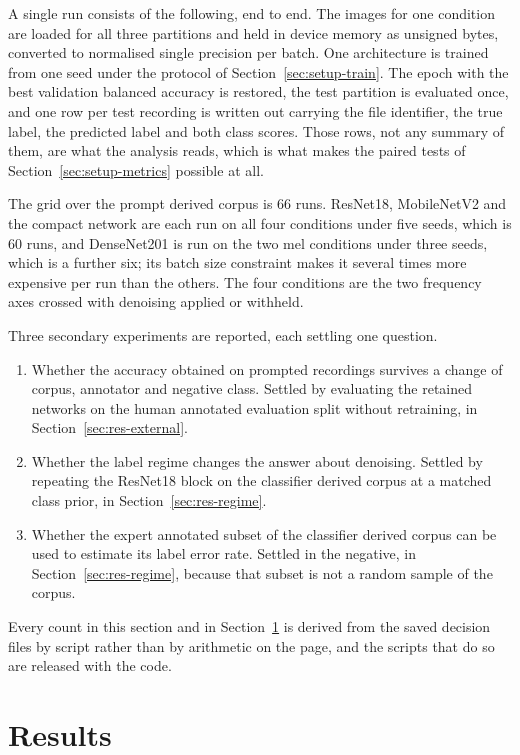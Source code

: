 \documentclass{ieeeaccess}
\begin{document}
A single run consists of the following, end to end. The images for one condition are
loaded for all three partitions and held in device memory as unsigned bytes, converted to
normalised single precision per batch. One architecture is trained from one seed under
the protocol of Section~\ref{sec:setup-train}. The epoch with the best validation
balanced accuracy is restored, the test partition is evaluated once, and one row per test
recording is written out carrying the file identifier, the true label, the predicted
label and both class scores. Those rows, not any summary of them, are what the analysis
reads, which is what makes the paired tests of Section~\ref{sec:setup-metrics} possible
at all.

The grid over the prompt derived corpus is $66$ runs. ResNet18, MobileNetV2 and the
compact network are each run on all four conditions under five seeds, which is $60$ runs,
and DenseNet201 is run on the two mel conditions under three seeds, which is a further
six; its batch size constraint makes it several times more expensive per run than the
others. The four conditions are the two frequency axes crossed with denoising applied or
withheld.

Three secondary experiments are reported, each settling one question.
\begin{enumerate}
\item Whether the accuracy obtained on prompted recordings survives a change of corpus,
      annotator and negative class. Settled by evaluating the retained networks on the
      human annotated evaluation split without retraining, in
      Section~\ref{sec:res-external}.
\item Whether the label regime changes the answer about denoising. Settled by repeating
      the ResNet18 block on the classifier derived corpus at a matched class prior, in
      Section~\ref{sec:res-regime}.
\item Whether the expert annotated subset of the classifier derived corpus can be used to
      estimate its label error rate. Settled in the negative, in
      Section~\ref{sec:res-regime}, because that subset is not a random sample of the
      corpus.
\end{enumerate}

Every count in this section and in Section~\ref{sec:results} is derived from the saved
decision files by script rather than by arithmetic on the page, and the scripts that do
so are released with the code.

\section{Results}\label{sec:results}
\end{document}
